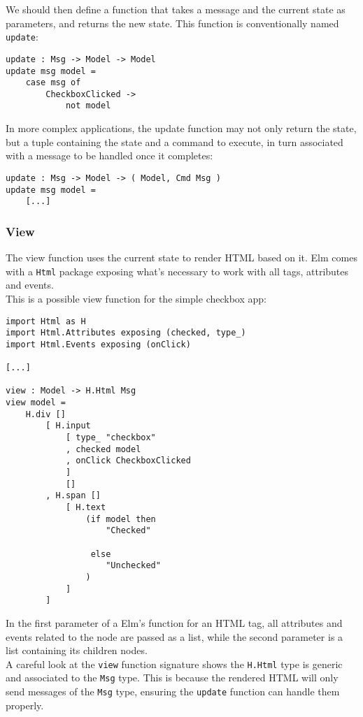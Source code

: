 We should then define a function that takes a message and the current state as parameters, and returns the new state. This function is conventionally named \texttt{update}:
\begin{verbatim}
update : Msg -> Model -> Model
update msg model =
    case msg of
        CheckboxClicked ->
            not model
\end{verbatim}

In more complex applications, the update function may not only return the state, but a tuple containing the state and a command to execute, in turn associated with a message to be handled once it completes:
\begin{verbatim}
update : Msg -> Model -> ( Model, Cmd Msg )
update msg model =
    [...]
\end{verbatim}

\subsubsection{View}
The view function uses the current state to render HTML based on it. Elm comes with a \texttt{Html} package exposing what's necessary to work with all tags, attributes and events.\\
This is a possible view function for the simple checkbox app:
\begin{verbatim}
import Html as H
import Html.Attributes exposing (checked, type_)
import Html.Events exposing (onClick)

[...]

view : Model -> H.Html Msg
view model =
    H.div []
        [ H.input
            [ type_ "checkbox"
            , checked model
            , onClick CheckboxClicked
            ]
            []
        , H.span []
            [ H.text
                (if model then
                    "Checked"

                 else
                    "Unchecked"
                )
            ]
        ]
\end{verbatim}
In the first parameter of a Elm's function for an HTML tag, all attributes and events related to the node are passed as a list, while the second parameter is a list containing its children nodes.\\

A careful look at the \texttt{view} function signature shows the \texttt{H.Html} type is generic and associated to the \texttt{Msg} type. This is because the rendered HTML will only send messages of the \texttt{Msg} type, ensuring the \texttt{update} function can handle them properly.

